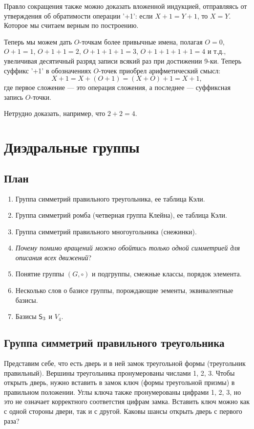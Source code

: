 Правло сокращения также можно доказать вложенной индукцией, отправляясь от утверждения об обратимости операции '+1': если $X+1=Y+1$, то $X=Y$. Которое мы считаем верным по построению.

Теперь мы можем дать $O$-точкам более привычные имена, полагая $O=0$, $O+1=1$, $O+1+1=2$, $O+1+1+1=3$, $O+1+1+1+1=4$ и т.д., увеличивая десятичный разряд записи всякий раз при достижении 9-ки. Теперь суффикс '+1' в обозначениях $O$-точек приобрел арифметический смысл:
$$
X+1 = X+(O+1)=(X+O)+1=X+1,
$$
где первое сложение --- это операция сложения, а последнее --- суффиксная запись $O$-точки.

Нетрудно доказать, например, что $2+2=4$.



\section{Диэдральные группы}


\subsection{План}
\begin{enumerate}
\item Группа симметрий правильного треугольника, ее таблица Кэли.
\item Группа симметрий ромба (четверная группа Клейна), ее таблица Кэли.
\item Группа симметрий правильного многоугольника (снежинки).
\item \textit{Почему помимо вращений можно обойтись только одной симметрией для описания всех движений}?
\item Понятие группы $(G,\circ)$ и подгруппы, смежные классы, порядок элемента.
\item Несколько слов о базисе группы, порождающие эементы, эквивалентные базисы.
\item Базисы ${\mathsf{S}}_3$ и $V_4$.
\end{enumerate}

\subsection{Группа симметрий правильного треугольника}

Представим себе, что есть дверь и в ней замок треугольной формы (треугольник правильный). Вершины треугольника пронумерованы числами 1, 2, 3. Чтобы открыть дверь, нужно вставить в замок ключ (формы треугольной призмы) в правильном положении.
Углы ключа также пронумерованы цифрами 1, 2, 3, но это не означает корректного соответстия цифрам замка.
Вставить ключ можно как с одной стороны двери, так и с другой. Каковы шансы открыть дверь с первого раза?

